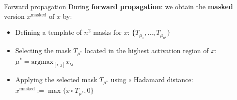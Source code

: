 \documentclass{beamer}
\begin{document}



\begin{frame}{Forward propagation}
	During \textbf{forward propagation}: we obtain the \textbf{masked} version $x^{\mathrm{masked}}$ of $x$ by:
	\begin{itemize}[<+->]
        \item Defining a template of $n^2$ masks for $x$: $\{T_{\mu_1}, \ldots, T_{\mu_{n^2}}\}$
        \item Selecting the mask $T_{\mu^{*}}$ located in the highest activation region of $x$: $\mu^{*}= \mathrm{argmax}_{ [i, j]}x_{ij}$
        \item Applying the selected mask $T_{\mu^{*}}$ using $\circ$ Hadamard distance: $x^{\mathrm{masked}} := \max \{ x\circ T_{\mu^{*}}, 0 \}$
    \end{itemize}
\end{frame}

\end{document}
